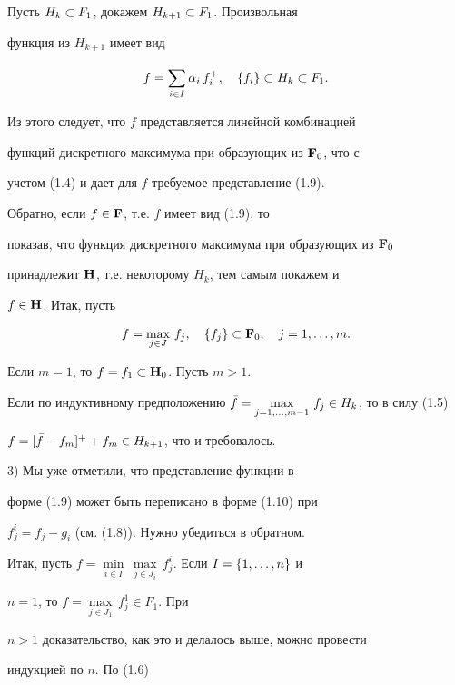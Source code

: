 \begin{pf}
Пусть $H_k \subset F_1$, докажем $H_{k+1} \subset F_1$. Произвольная


функция из $H_{k+1}$ имеет вид


$$


f = \sij{i\in I}{} \al_i\, f_i^+,\quad \{ f_i \} \su H_k\su F_1.


$$


Из этого следует, что $f$ представляется линейной комбинацией


функций дискретного максимума при образующих из $\bold F_0$, что с


учетом (1.4) и дает для $f$ требуемое представление (1.9).





Обратно, если $f\in \bold F$, т.е. $f$ имеет вид (1.9), то


показав, что функция дискретного максимума при образующих из $\bold F_0$


принадлежит $\bold H$, т.е. некоторому $H_k$, тем самым покажем и


$f\in \bold H$. Итак, пусть


$$


f = \max_{j\in J}\, f_j,\quad \{ f_j \} \su\F_0,\quad j=\ij{m}.


$$


Если $m=1$, то $f =f_1 \subset \bold H_0$. Пусть $m>1$.


Если по индуктивному предположению $\Bar{f} =


\max\limits_{j=1,\dotsc,m-1}\, f_j \in H_k$, то в силу (1.5)


$f = [\Bar{f}-f_m]^+ +f_m \in H_{k+1}$, что и требовалось.


\medskip





3) Мы уже отметили, что представление функции в


форме (1.9) может быть переписано в форме (1.10) при


$f_j^i = f_j -g_i$ (см. (1.8)). Нужно убедиться в обратном.


Итак, пусть $f = \min\limits_{i\in I}\,


\max\limits_{j\in J_i}\, f_j^i$. Если $I=\{\ij{n}\}$ и


$n=1$, то $f=\max\limits_{j\in J_1}\, f_j^1 \in F_1$. При


$n>1$ доказательство, как это и делалось выше, можно провести


индукцией по $n$. По (1.6)



\end{pf}
